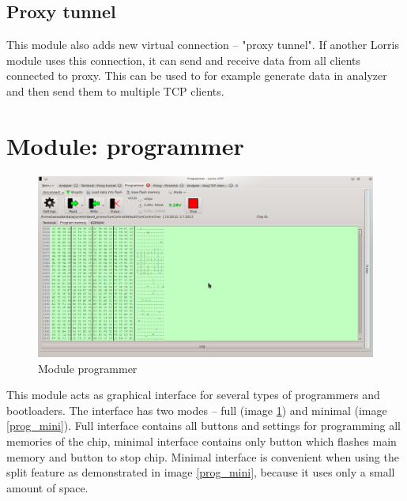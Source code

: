 \documentclass[12pt, a4paper, oneside]{article}
\begin{document}
\subsection{Proxy tunnel}
This module also adds new virtual connection -- "proxy tunnel". If another Lorris module uses this connection, it can send and receive data from all clients connected to proxy. This can be used to for example generate data in analyzer and then send them to multiple TCP clients.

\newpage
\setlength{\voffset}{0mm} %
\pagestyle{plain}

\section{Module: programmer}
\begin{figure}[H]
\begin{center}
\includegraphics[width=\textwidth]{img/programmer.png}
\caption{Module programmer}
\label{prog_full}
\end{center}
\end{figure}

This module acts as graphical interface for several types of programmers and bootloaders. The interface has two modes -- full (image \ref{prog_full}) and minimal (image \ref{prog_mini}). Full interface contains all buttons and settings for programming all memories of the chip, minimal interface contains only button which flashes main memory and button to stop chip. Minimal interface is convenient when using the split feature as demonstrated in image \ref{prog_mini}, because it uses only a small amount of space.
\end{document}
